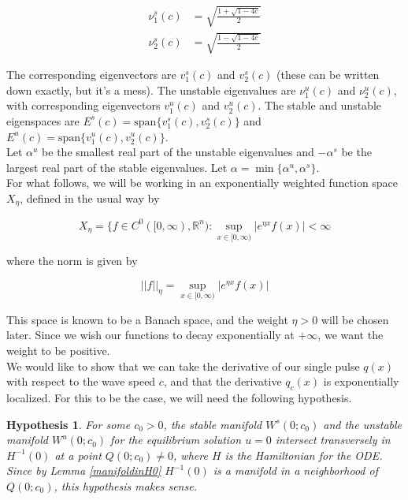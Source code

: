 \documentclass[12pt]{article}
\def\R{{\mathbb R}}
\newtheorem{hypothesis}{Hypothesis}
\begin{document}
\begin{align*}
\nu_1^s(c) &= \sqrt{ \frac{1 + \sqrt{1 - 4c} }{2}}\\
\nu_2^s(c) &= \sqrt{ \frac{1 - \sqrt{1 - 4c} }{2}}
\end{align*}

The corresponding eigenvectors are $v_1^s(c)$ and $v_2^s(c)$ (these can be written down exactly, but it's a mess). The unstable eigenvalues are $\nu_1^u(c)$ and $\nu_2^u(c)$, with corresponding eigenvectors $v_1^u(c)$ and $v_2^u(c)$. The stable and unstable eigenspaces are $E^s(c) = \text{span}\{ v_1^s(c), v_2^s(c) \}$ and $E^u(c) = \text{span}\{ v_1^u(c), v_2^u(c) \}$.\\

Let $\alpha^u$ be the smallest real part of the unstable eigenvalues and $-\alpha^s$ be the largest real part of the stable eigenvalues. Let $\alpha = \min \{ \alpha^u, \alpha^s \}$.\\

For what follows, we will be working in an exponentially weighted function space $X_\eta$, defined in the usual way by 

\[
X_\eta = \{ f \in C^0([0, \infty), \R^n) : \sup_{x \in [0, \infty)} |e^{\eta x} f(x)| < \infty 
\]

where the norm is given by

\[
||f||_\eta = \sup_{x \in [0, \infty)} |e^{\eta x} f(x)|
\]

This space is known to be a Banach space, and the weight $\eta > 0$ will be chosen later. Since we wish our functions to decay exponentially at $+\infty$, we want the weight to be positive.\\

We would like to show that we can take the derivative of our single pulse $q(x)$ with respect to the wave speed $c$, and that the derivative $q_c(x)$ is exponentially localized. For this to be the case, we will need the following hypothesis.

\begin{hypothesis}\label{transverseint}
For some $c_0 > 0$, the stable manifold $W^s(0; c_0)$ and the unstable manifold $W^u(0; c_0)$ for the equilibrium solution $u = 0$ intersect transversely in $H^{-1}(0)$ at a point $Q(0; c_0) \neq 0$, where $H$ is the Hamiltonian for the ODE. Since by Lemma \eqref{manifoldinH0} $H^{-1}(0)$ is a manifold in a neighborhood of $Q(0; c_0)$, this hypothesis makes sense.
\end{hypothesis}
\end{document}
